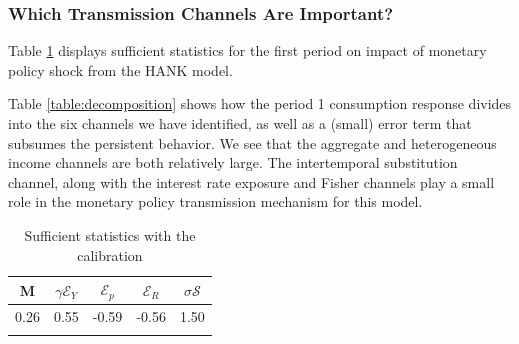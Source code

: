 \documentclass[12pt,a4paper]{article}
\begin{document}
\subsubsection{Which Transmission Channels Are Important?}
Table \ref{table:suff_stat} displays sufficient statistics for the first period on impact of monetary policy shock from the HANK model.\par
Table \ref{table:decomposition} shows how the period 1 consumption response divides into the six channels we have identified, as well as a (small) error term that subsumes the persistent behavior. We see that the aggregate and heterogeneous income channels are both relatively large. The intertemporal substitution channel, along with the interest rate exposure and Fisher channels play a small role in the monetary policy transmission mechanism for this model.

\begin{table}[!ht]
\caption{\normalsize{Sufficient statistics with the calibration}} 
\centering 
\begin{tabular}{ccccc}
 M & $\gamma \mathcal{E}_Y$ & $\mathcal{E}_p$ & $\mathcal{E}_R$ & $ \sigma \mathcal{S}$\\
 \toprule
 0.26 & 0.55 & -0.59 & -0.56 & 1.50 \\
 \bottomrule
\label{table:suff_stat}
\end{tabular}
\end{table}



\begin{figure}[!ht]
\begin{floatrow}
{%
  \caption{}%
}
\end{floatrow}
\end{figure}
\end{document}
